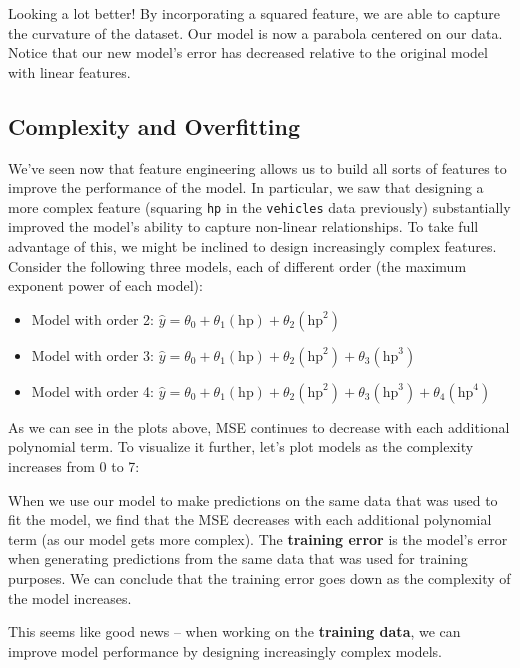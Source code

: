 \documentclass[
  letterpaper,
  DIV=11,
  numbers=noendperiod]{scrreprt}
\providecommand{\tightlist}{%
  \setlength{\itemsep}{0pt}\setlength{\parskip}{0pt}}\usepackage{longtable,booktabs,array}
\begin{document}
Looking a lot better! By incorporating a squared feature, we are able to
capture the curvature of the dataset. Our model is now a parabola
centered on our data. Notice that our new model's error has decreased
relative to the original model with linear features.

\subsection{Complexity and
Overfitting}\label{complexity-and-overfitting}

We've seen now that feature engineering allows us to build all sorts of
features to improve the performance of the model. In particular, we saw
that designing a more complex feature (squaring \texttt{hp} in the
\texttt{vehicles} data previously) substantially improved the model's
ability to capture non-linear relationships. To take full advantage of
this, we might be inclined to design increasingly complex features.
Consider the following three models, each of different order (the
maximum exponent power of each model):

\begin{itemize}
\tightlist
\item
  Model with order 2:
  \(\hat{y} = \theta_0 + \theta_1 (\text{hp}) + \theta_2 (\text{hp}^2)\)
\item
  Model with order 3:
  \(\hat{y} = \theta_0 + \theta_1 (\text{hp}) + \theta_2 (\text{hp}^2) + \theta_3 (\text{hp}^3)\)
\item
  Model with order 4:
  \(\hat{y} = \theta_0 + \theta_1 (\text{hp}) + \theta_2 (\text{hp}^2) + \theta_3 (\text{hp}^3) + \theta_4 (\text{hp}^4)\)
\end{itemize}

As we can see in the plots above, MSE continues to decrease with each
additional polynomial term. To visualize it further, let's plot models
as the complexity increases from 0 to 7:

When we use our model to make predictions on the same data that was used
to fit the model, we find that the MSE decreases with each additional
polynomial term (as our model gets more complex). The \textbf{training
error} is the model's error when generating predictions from the same
data that was used for training purposes. We can conclude that the
training error goes down as the complexity of the model increases.

This seems like good news -- when working on the \textbf{training data},
we can improve model performance by designing increasingly complex
models.
\end{document}
